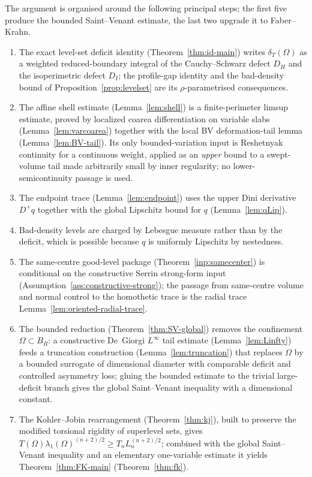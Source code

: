 \documentclass[11pt]{amsart}
\theoremstyle{definition}
\newcommand{\Om}{\Omega}
\newcommand{\dT}{\delta_T}
\begin{document}
The argument is organised around the following principal steps; the first five
produce the bounded Saint--Venant estimate, the last two upgrade it to
Faber--Krahn.
\begin{enumerate}[leftmargin=2em]
\item The exact level-set deficit identity (Theorem~\ref{thm:id-main}) writes
\(\dT(\Om)\) as a weighted reduced-boundary integral of the Cauchy--Schwarz
defect \(D_H\) and the isoperimetric defect \(D_I\); the profile-gap identity
and the bad-density bound of Proposition~\ref{prop:levelset} are its
\(\rho\)-parametrised consequences.
\item The affine shell estimate (Lemma~\ref{lem:shell}) is a finite-perimeter
limsup estimate, proved by localized coarea differentiation on variable slabs
(Lemma~\ref{lem:varcoarea}) together with the local BV deformation-tail lemma
(Lemma~\ref{lem:BV-tail}).  Its only bounded-variation input is Reshetnyak
continuity for a continuous weight, applied as an \emph{upper} bound to a
swept-volume tail made arbitrarily small by inner regularity; no
lower-semicontinuity passage is used.
\item The endpoint trace (Lemma~\ref{lem:endpoint}) uses the upper Dini
derivative \(D^+q\) together with the global Lipschitz bound for \(q\)
(Lemma~\ref{lem:qLip}).
\item Bad-density levels are charged by Lebesgue measure rather than by the
deficit, which is possible because \(q\) is uniformly Lipschitz by nestedness.
\item The same-centre good-level package (Theorem~\ref{inp:samecenter}) is
conditional on the constructive Serrin strong-form input
(Assumption~\ref{ass:constructive-strong}); the passage from same-centre volume
and normal control to the homothetic trace is the radial trace
Lemma~\ref{lem:oriented-radial-trace}.
\item The bounded reduction (Theorem~\ref{thm:SV-global}) removes the
confinement \(\Om\subset B_R\): a constructive De~Giorgi \(L^\infty\) tail
estimate (Lemma~\ref{lem:Linfty}) feeds a truncation construction
(Lemma~\ref{lem:truncation}) that replaces \(\Om\) by a bounded surrogate of
dimensional diameter with comparable deficit and controlled asymmetry loss;
gluing the bounded estimate to the trivial large-deficit branch gives the
global Saint--Venant inequality with a dimensional constant.
\item The Kohler--Jobin rearrangement (Theorem~\ref{thm:kj}), built to preserve
the modified torsional rigidity of superlevel sets, gives
\(T(\Om)\lambda_1(\Om)^{(n+2)/2}\ge T_n L_n^{(n+2)/2}\); combined with the
global Saint--Venant inequality and an elementary one-variable estimate it
yields Theorem~\ref{thm:FK-main} (Theorem~\ref{thm:fk}).
\end{enumerate}
\end{document}
